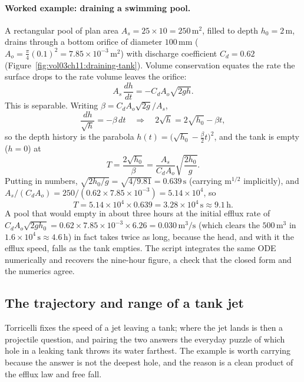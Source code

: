 \paragraph{Worked example: draining a swimming pool.} A rectangular
pool of plan area $A_s = 25\times 10 = 250\,\si{\meter}^2$, filled to
depth $h_0 = 2\,\si{\meter}$, drains through a bottom orifice of
diameter $100\,\si{\milli\meter}$ ($A_o = \tfrac{\pi}{4}(0.1)^2 =
7.85\times 10^{-3}\,\si{\meter}^2$) with discharge coefficient $C_d =
0.62$ (Figure~\ref{fig:vol03ch11:draining-tank}). Volume conservation
equates the rate the surface drops to the rate volume leaves the
orifice:
\[
A_s\,\frac{dh}{dt} = -C_d A_o \sqrt{2 g h}.
\]
This is separable. Writing $\beta = C_d A_o \sqrt{2g}/A_s$,
\[
\frac{dh}{\sqrt{h}} = -\beta\,dt
\quad\Longrightarrow\quad
2\sqrt{h} = 2\sqrt{h_0} - \beta t,
\]
so the depth history is the parabola $h(t) = \big(\sqrt{h_0} -
\tfrac{\beta}{2}t\big)^2$, and the tank is empty ($h = 0$) at
\[
T = \frac{2\sqrt{h_0}}{\beta}
= \frac{A_s}{C_d A_o}\sqrt{\frac{2 h_0}{g}}.
\]
Putting in numbers, $\sqrt{2 h_0/g} = \sqrt{4/9.81} =
0.639\,\si{\second}$ (carrying $\si{\meter}^{1/2}$ implicitly), and
$A_s/(C_d A_o) = 250/(0.62\times 7.85\times 10^{-3}) = 5.14\times
10^4$, so
\[
T = 5.14\times 10^4 \times 0.639 = 3.28\times 10^4\,\si{\second}
\approx 9.1\,\text{h}.
\]
A pool that would empty in about three hours at the initial efflux
rate of $C_d A_o\sqrt{2 g h_0} = 0.62\times 7.85\times 10^{-3}\times
6.26 = 0.030\,\si{\meter\cubed\per\second}$ (which clears the
$500\,\si{\meter}^3$ in $1.6\times 10^4\,\si{\second}\approx
4.6\,\text{h}$) in fact takes twice as long, because the head, and
with it the efflux speed, falls as the tank empties. The script
 integrates the same ODE numerically and
recovers the nine-hour figure, a check that the closed form and the
numerics agree.

\subsection{The trajectory and range of a tank jet}

Torricelli fixes the speed of a jet leaving a tank; where the jet lands
is then a projectile question, and pairing the two answers the everyday
puzzle of which hole in a leaking tank throws its water farthest. The
example is worth carrying because the answer is not the deepest hole,
and the reason is a clean product of the efflux law and free fall.

